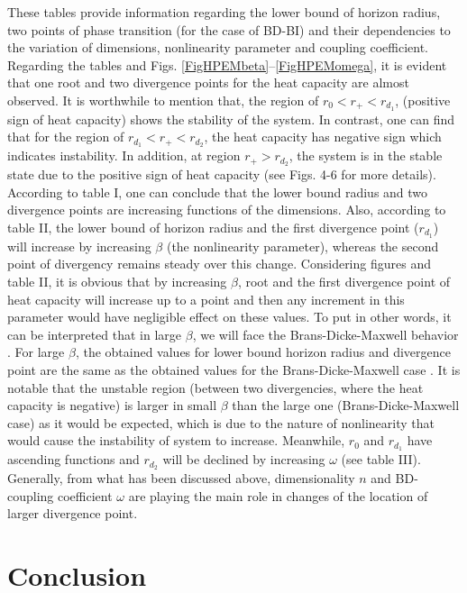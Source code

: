\documentclass[aps,onecolumn ]{revtex4}
\begin{document}
These tables provide information regarding the lower bound of
horizon radius, two points of phase transition (for the case of
BD-BI) and their dependencies to the variation of dimensions,
nonlinearity parameter and coupling coefficient. Regarding the
tables and Figs. \ref{FigHPEMbeta}--\ref{FigHPEMomega}, it is
evident that one root and two divergence points for the heat
capacity are almost observed. It is worthwhile to mention that,
the region of $r_{0}<r_{+}<r_{d_1}$, (positive sign of heat
capacity) shows the stability of the system. In contrast, one can
find that for the region of $r_{d_1}<r_{+}<r_{d_2}$, the heat
capacity has negative sign which indicates instability. In
addition, at region $r_{+}>r_{d_2}$, the system is in the stable
state due to the positive sign of heat capacity (see Figs. 4-6 for
more details). According to table I, one can conclude that the
lower bound radius and two divergence points are increasing
functions of the dimensions. Also, according to table II, the
lower bound of horizon radius and the first divergence point
($r_{d_1}$) will increase by increasing $\beta $ (the nonlinearity
parameter), whereas the second point of divergency remains steady
over this change. Considering figures and table II, it is obvious
that by increasing $\beta$, root and the first divergence point of
heat capacity will increase up to a point and then any increment
in this parameter would have negligible effect on these values. To
put in other words, it can be interpreted that in large $\beta $,
we will face the Brans-Dicke-Maxwell behavior \cite{BD-Max}. For
large $\beta $, the obtained values for lower bound horizon radius
and divergence point are the same as the obtained values for the
Brans-Dicke-Maxwell case \cite{BD-Max}. It is notable that the
unstable region (between two divergencies, where the heat capacity
is negative) is larger in small $\beta $ than the large one
(Brans-Dicke-Maxwell case) as it would be expected, which is due
to the nature of nonlinearity that would cause the instability of
system to increase. Meanwhile, $r_{0}$ and $r_{d_1}$ have
ascending functions and $r_{d_2}$ will be declined by increasing
$\omega $ (see table III). Generally, from what has been discussed
above, dimensionality $n$ and BD-coupling coefficient $\omega $
are playing the main role in changes of the location of larger
divergence point.


\section{Conclusion}
\end{document}
